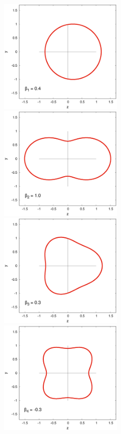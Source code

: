 \documentclass[a4paper,polish,twoside]{article}
\numberwithin{equation}{section}
\begin{document}
\vspace*{\fill}
\begin{figure}[ht!]
    \centering
    \includegraphics[width=6cm]{s1.eps}
    \hspace{1cm}
    \includegraphics[width=6cm]{s2.eps}\\    
    \vspace{1.5cm}
    \includegraphics[width=6cm]{s3.eps}
    \hspace{1cm}
    \includegraphics[width=6cm]{s4.eps}\\    

\end{figure}
\end{document}
